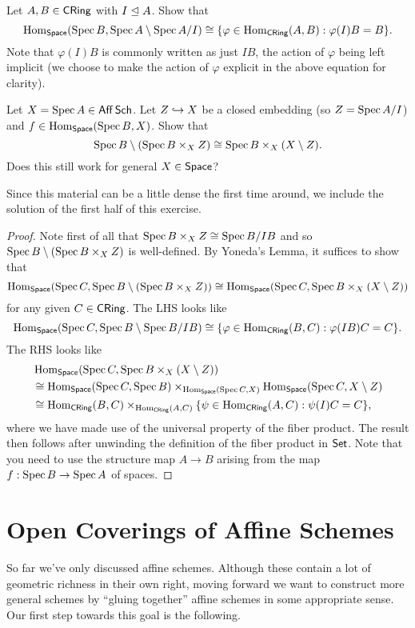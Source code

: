 \documentclass[11pt]{article}
\renewcommand{\phi}{\varphi}
\begin{document}
\begin{exercise}
Let $A,B\in\operatorname{\mathsf{CRing}}$ with $I\trianglelefteq A$. Show that 
$$\Hom_{\Space}(\Spec B,\Spec A\setminus\Spec A/I)\iso\{\phi\in\Hom_{\CRing}(A,B) : \phi(I)B=B\}.$$
Note that $\phi(I)B$ is commonly written as just $IB$, the action of $\phi$ being left implicit (we choose to make the action of $\phi$ explicit in the above equation for clarity).
\end{exercise}

\begin{exercise}
Let $X=\operatorname{Spec} A\in\operatorname{\mathsf{Aff}}\operatorname{\mathsf{Sch}}$. Let $Z\hookrightarrow X$ be a closed embedding (so $Z=\operatorname{Spec} A/I$) and $f\in\operatorname{Hom}_{\operatorname{\mathsf{Space}}}(\operatorname{Spec} B,X)$. Show that
$$\operatorname{Spec} B\setminus(\operatorname{Spec} B\times_XZ)\cong\operatorname{Spec} B\times_X(X\setminus Z).$$
Does this still work for general $X\in\operatorname{\mathsf{Space}}$?
\end{exercise}

Since this material can be a little dense the first time around, we include the solution of the first half of this exercise.

\begin{proof}
Note first of all that $\operatorname{Spec} B\times_XZ\cong\operatorname{Spec} B/IB$ and so $\operatorname{Spec} B\setminus(\operatorname{Spec} B\times_XZ)$ is well-defined. By Yoneda's Lemma, it suffices to show that 
$$\operatorname{Hom}_{\operatorname{\mathsf{Space}}}(\operatorname{Spec} C,\operatorname{Spec} B\setminus(\operatorname{Spec} B\times_XZ))\cong\operatorname{Hom}_{\operatorname{\mathsf{Space}}}(\operatorname{Spec} C,\operatorname{Spec} B\times_X(X\setminus Z))$$
for any given $C\in\operatorname{\mathsf{CRing}}$. The LHS looks like
$$\Hom_{\Space}(\Spec C,\Spec B\setminus\Spec B/IB)\iso\{\phi\in\Hom_{\CRing}(B,C) : \phi(IB)C=C\}.$$
The RHS looks like 
\begin{align*}
&\operatorname{Hom}_{\operatorname{\mathsf{Space}}}(\operatorname{Spec} C,\operatorname{Spec} B\times_X(X\setminus Z)) \\
&\cong\operatorname{Hom}_{\operatorname{\mathsf{Space}}}(\operatorname{Spec} C,\operatorname{Spec} B)\times_{\operatorname{Hom}_{\operatorname{\mathsf{Space}}}(\operatorname{Spec} C,X)}\operatorname{Hom}_{\operatorname{\mathsf{Space}}}(\operatorname{Spec} C,X\setminus Z) \\
&\cong\operatorname{Hom}_{\operatorname{\mathsf{CRing}}}(B,C)\times_{\operatorname{Hom}_{\operatorname{\mathsf{CRing}}}(A,C)}\{\psi\in\operatorname{Hom}_{\operatorname{\mathsf{CRing}}}(A,C) : \psi(I)C=C\},
\end{align*}
where we have made use of the universal property of the fiber product. The result then follows after unwinding the definition of the fiber product in $\operatorname{\mathsf{Set}}$. Note that you need to use the structure map $A\to B$ arising from the map $f: \operatorname{Spec} B\to\operatorname{Spec} A$ of spaces.
\end{proof}

\section{Open Coverings of Affine Schemes}
So far we've only discussed affine schemes. Although these contain a lot of geometric richness in their own right, moving forward we want to construct more general schemes by ``gluing together'' affine schemes in some appropriate sense. Our first step towards this goal is the following.
\end{document}

